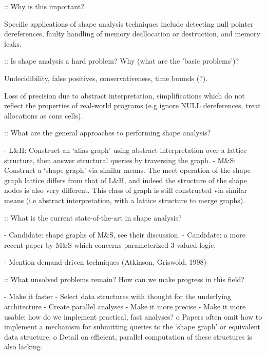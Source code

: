 \documentclass{article}
\begin{document}
:: Why is this important?

Specific applications of shape analysis techniques include detecting null
pointer dereferences, faulty handling of memory deallocation or destruction,
and memory leaks.

:: Is shape analysis a hard problem? Why (what are the 'basic problems')?

Undecidibility, false positives, conservativeness, time bounds (?).

Loss of precision due to abstract interpretation, simplifications which do not
reflect the properties of real-world programs (e.g ignore NULL dereferences,
treat allocations as cons cells).

:: What are the general approaches to performing shape analysis?

- L\&H: Construct an `alias graph' using abstract interpretation over a lattice
  structure, then answer structural queries by traversing the graph.
- M\&S: Construct a `shape graph' via similar means. The meet operation of the
  shape graph lattice differs from that of L\&H, and indeed the structure of the
  shape nodes is also very different. This class of graph is still constructed
  via similar means (i.e abstract interpretation, with a lattice structure to
  merge graphs).

:: What is the current state-of-the-art in shape analysis?

- Candidate: shape graphs of M\&S, see their discussion.
- Candidate: a more recent paper by M\&S which concerns parameterized 3-valued
  logic.

- Mention demand-driven techniques (Atkinson, Griswold, 1998)

:: What unsolved problems remain? How can we make progress in this field?

- Make it faster
    - Select data structures with thought for the underlying architecture
    - Create parallel analyses
- Make it more precise
- Make it more usable: how do we implement practical, fast analyses?
	o Papers often omit how to implement a mechanism for submitting queries
	  to the `shape graph' or equivalent data structure.  
	o Detail on efficient, parallel computation of these structures is also
	  lacking.
\end{document}
